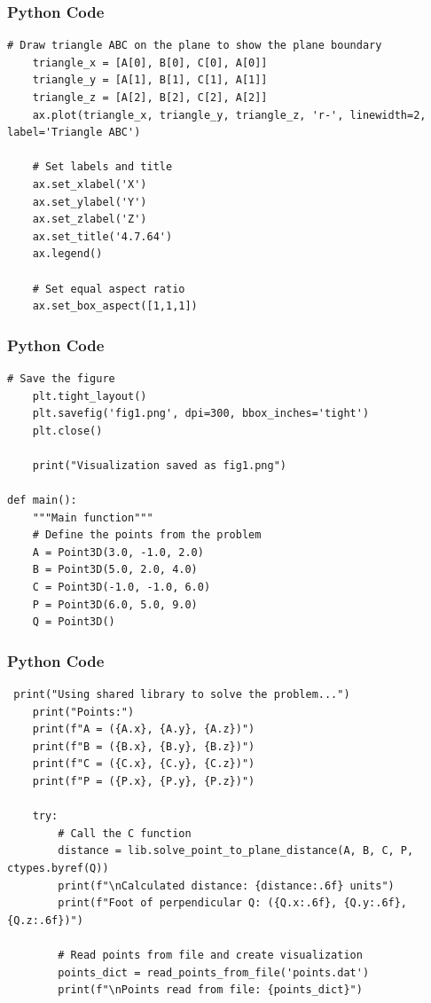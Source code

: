 \documentclass{beamer}
\begin{document}
\begin{frame}[fragile]
    \frametitle{Python Code}
    \begin{lstlisting}
# Draw triangle ABC on the plane to show the plane boundary
    triangle_x = [A[0], B[0], C[0], A[0]]
    triangle_y = [A[1], B[1], C[1], A[1]]
    triangle_z = [A[2], B[2], C[2], A[2]]
    ax.plot(triangle_x, triangle_y, triangle_z, 'r-', linewidth=2, label='Triangle ABC')

    # Set labels and title
    ax.set_xlabel('X')
    ax.set_ylabel('Y')
    ax.set_zlabel('Z')
    ax.set_title('4.7.64')
    ax.legend()

    # Set equal aspect ratio
    ax.set_box_aspect([1,1,1])
    \end{lstlisting}
\end{frame}

\begin{frame}[fragile]
    \frametitle{Python Code}
    \begin{lstlisting}
# Save the figure
    plt.tight_layout()
    plt.savefig('fig1.png', dpi=300, bbox_inches='tight')
    plt.close()

    print("Visualization saved as fig1.png")

def main():
    """Main function"""
    # Define the points from the problem
    A = Point3D(3.0, -1.0, 2.0)
    B = Point3D(5.0, 2.0, 4.0)
    C = Point3D(-1.0, -1.0, 6.0)
    P = Point3D(6.0, 5.0, 9.0)
    Q = Point3D()
    \end{lstlisting}
\end{frame}

\begin{frame}[fragile]
    \frametitle{Python Code}
    \begin{lstlisting}
 print("Using shared library to solve the problem...")
    print("Points:")
    print(f"A = ({A.x}, {A.y}, {A.z})")
    print(f"B = ({B.x}, {B.y}, {B.z})")
    print(f"C = ({C.x}, {C.y}, {C.z})")
    print(f"P = ({P.x}, {P.y}, {P.z})")

    try:
        # Call the C function
        distance = lib.solve_point_to_plane_distance(A, B, C, P, ctypes.byref(Q))
        print(f"\nCalculated distance: {distance:.6f} units")
        print(f"Foot of perpendicular Q: ({Q.x:.6f}, {Q.y:.6f}, {Q.z:.6f})")

        # Read points from file and create visualization
        points_dict = read_points_from_file('points.dat')
        print(f"\nPoints read from file: {points_dict}")
    \end{lstlisting}
\end{frame}
\end{document}
